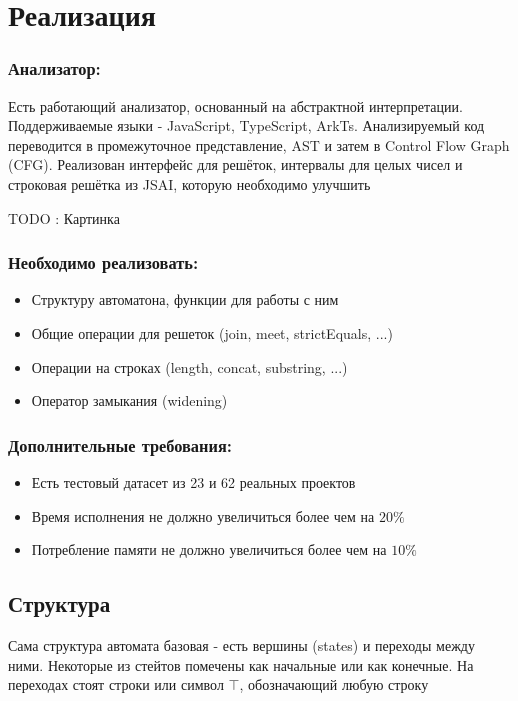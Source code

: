 \section{Реализация}

\subsubsection*{Анализатор:}
Есть работающий анализатор, основанный на абстрактной интерпретации. Поддерживаемые языки - JavaScript, TypeScript, ArkTs. Анализируемый код переводится в промежуточное представление, AST и затем в Control Flow Graph (CFG). Реализован интерфейс для решёток, интервалы для целых чисел и строковая решётка из JSAI, которую необходимо улучшить

TODO : Картинка
\subsubsection*{Необходимо реализовать:}
\begin{itemize}
    \item Структуру автоматона, функции для работы с ним
    \item Общие операции для решеток (join, meet, strictEquals, ...)
    \item Операции на строках (length, concat, substring, ...)
    \item Оператор замыкания (widening)
\end{itemize}

\subsubsection*{Дополнительные требования:}
\begin{itemize}
    \item Есть тестовый датасет из 23 и 62 реальных проектов
    \item Время исполнения не должно увеличиться более чем на $20\%$
    \item Потребление памяти не должно увеличиться более чем на $10\%$
\end{itemize}

\newpage
\subsection{Структура}
Сама структура автомата базовая - есть вершины (states) и переходы между ними. Некоторые из стейтов помечены как начальные или как конечные. На переходах стоят строки или символ $\top$, обозначающий любую строку

